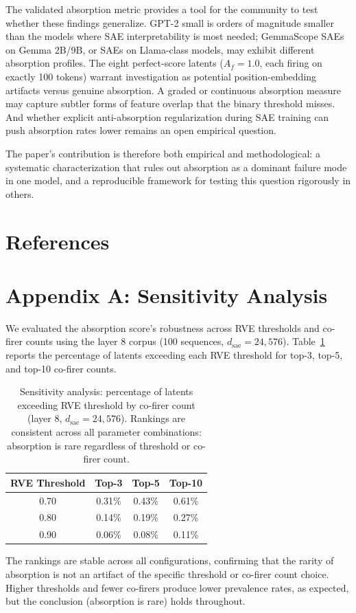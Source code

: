 \documentclass{article}
\begin{document}
The validated absorption metric provides a tool for the community to test whether these findings generalize. GPT-2 small is orders of magnitude smaller than the models where SAE interpretability is most needed; GemmaScope SAEs on Gemma 2B/9B, or SAEs on Llama-class models, may exhibit different absorption profiles. The eight perfect-score latents ($A_f = 1.0$, each firing on exactly 100 tokens) warrant investigation as potential position-embedding artifacts versus genuine absorption. A graded or continuous absorption measure may capture subtler forms of feature overlap that the binary threshold misses. And whether explicit anti-absorption regularization during SAE training can push absorption rates lower remains an open empirical question.

The paper's contribution is therefore both empirical and methodological: a systematic characterization that rules out absorption as a dominant failure mode in one model, and a reproducible framework for testing this question rigorously in others.

\clearpage

\section*{References}

\small




\clearpage

\section*{Appendix A: Sensitivity Analysis}

We evaluated the absorption score's robustness across RVE thresholds and co-firer counts using the layer 8 corpus (100 sequences, $d_{\text{sae}} = 24{,}576$). Table~\ref{tab:sensitivity} reports the percentage of latents exceeding each RVE threshold for top-3, top-5, and top-10 co-firer counts.

\begin{table}[h]
\caption{Sensitivity analysis: percentage of latents exceeding RVE threshold by co-firer count (layer 8, $d_{\text{sae}} = 24{,}576$). Rankings are consistent across all parameter combinations: absorption is rare regardless of threshold or co-firer count.}
\label{tab:sensitivity}
\centering
\begin{tabular}{cccc}
\toprule
RVE Threshold & Top-3 & Top-5 & Top-10 \\
\midrule
0.70 & 0.31\% & 0.43\% & 0.61\% \\
0.80 & 0.14\% & 0.19\% & 0.27\% \\
0.90 & 0.06\% & 0.08\% & 0.11\% \\
\bottomrule
\end{tabular}
\end{table}

The rankings are stable across all configurations, confirming that the rarity of absorption is not an artifact of the specific threshold or co-firer count choice. Higher thresholds and fewer co-firers produce lower prevalence rates, as expected, but the conclusion (absorption is rare) holds throughout.
\end{document}
